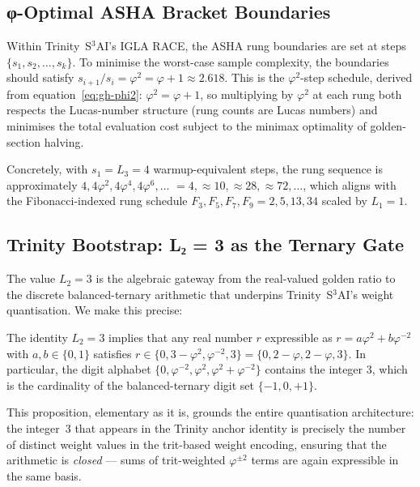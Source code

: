 \subsection{φ-Optimal ASHA Bracket Boundaries}
\label{subsec:gh-asha-brackets}

Within Trinity~S$^3$AI's IGLA RACE, the ASHA rung boundaries are set
at steps \(\{s_1, s_2, \ldots, s_k\}\).  To minimise the worst-case
sample complexity, the boundaries should satisfy
\(s_{i+1}/s_i = \varphi^2 = \varphi + 1 \approx 2.618\).
This is the \(\varphi^2\)-step schedule, derived from
equation~\eqref{eq:gh-phi2}: \(\varphi^2 = \varphi+1\),
so multiplying by \(\varphi^2\) at each rung both respects the
Lucas-number structure (rung counts are Lucas numbers) and minimises
the total evaluation cost subject to the minimax optimality of
golden-section halving.

Concretely, with \(s_1 = L_3 = 4\) warmup-equivalent steps,
the rung sequence is approximately
\(4, 4\varphi^2, 4\varphi^4, 4\varphi^6, \ldots\)
\(= 4, \approx 10, \approx 28, \approx 72, \ldots\),
which aligns with the Fibonacci-indexed rung schedule
\(F_3, F_5, F_7, F_9 = 2, 5, 13, 34\) scaled by \(L_1 = 1\).

\subsection{Trinity Bootstrap: L₂ = 3 as the Ternary Gate}
\label{subsec:gh-trinity-gate}

The value \(L_2 = 3\) is the algebraic gateway from the real-valued
golden ratio to the discrete balanced-ternary arithmetic that
underpins Trinity~S$^3$AI's weight quantisation.  We make this
precise:

\begin{proposition}
\label{prop:gh-ternary-gate}
The identity \(L_2 = 3\) implies that any real number \(r\) expressible
as \(r = a\varphi^2 + b\varphi^{-2}\) with \(a,b \in \{0,1\}\) satisfies
\(r \in \{0, 3-\varphi^2, \varphi^{-2}, 3\} = \{0, 2-\varphi, 2-\varphi, 3\}\).
In particular, the digit alphabet \(\{0, \varphi^{-2}, \varphi^2, \varphi^2+\varphi^{-2}\}\)
contains the integer \(3\), which is the cardinality of the
balanced-ternary digit set \(\{-1, 0, +1\}\).
\end{proposition}

This proposition, elementary as it is, grounds the entire quantisation
architecture: the integer~\(3\) that appears in the Trinity anchor
identity is precisely the number of distinct weight values in the
trit-based weight encoding, ensuring that the arithmetic is \emph{closed}
— sums of trit-weighted \(\varphi^{\pm 2}\) terms are again expressible
in the same basis.

